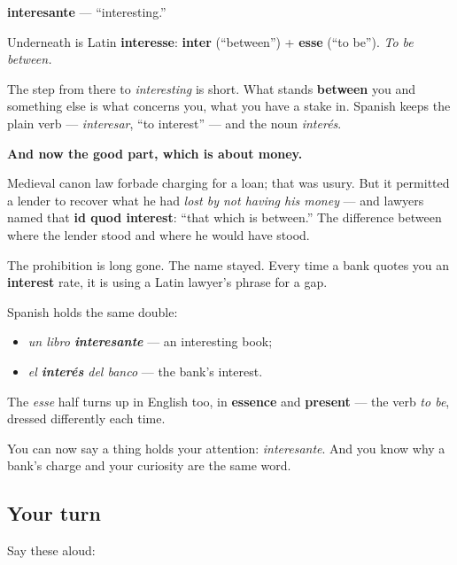\begin{cousinweb}
\textbf{interesante} — \textquotedblleft{}interesting.\textquotedblright{}

Underneath is Latin \textbf{interesse}: \textbf{inter} (\textquotedblleft{}between\textquotedblright{}) + \textbf{esse} (\textquotedblleft{}to be\textquotedblright{}). \emph{To be between.}

The step from there to \emph{interesting} is short. What stands \textbf{between} you and something else is what concerns you, what you have a stake in. Spanish keeps the plain verb — \emph{interesar}, \textquotedblleft{}to interest\textquotedblright{} — and the noun \emph{interés}.

\textbf{And now the good part, which is about money.}

Medieval canon law forbade charging for a loan; that was usury. But it permitted a lender to recover what he had \emph{lost by not having his money} — and lawyers named that \textbf{id quod interest}: \textquotedblleft{}that which is between.\textquotedblright{} The difference between where the lender stood and where he would have stood.

The prohibition is long gone. The name stayed. Every time a bank quotes you an \textbf{interest} rate, it is using a Latin lawyer's phrase for a gap.

Spanish holds the same double:

\begin{itemize}
\raggedright
  \item \emph{un libro \textbf{interesante}} — an interesting book;
  \item \emph{el \textbf{interés} del banco} — the bank's interest.
\end{itemize}

The \emph{esse} half turns up in English too, in \textbf{essence} and \textbf{present} — the verb \emph{to be}, dressed differently each time.
\end{cousinweb}

\begin{grammarlens}[title={What you've built}]
You can now say a thing holds your attention: \emph{interesante}. And you know why a bank's charge and your curiosity are the same word.
\end{grammarlens}

\subsection*{Your turn}
Say these aloud:


